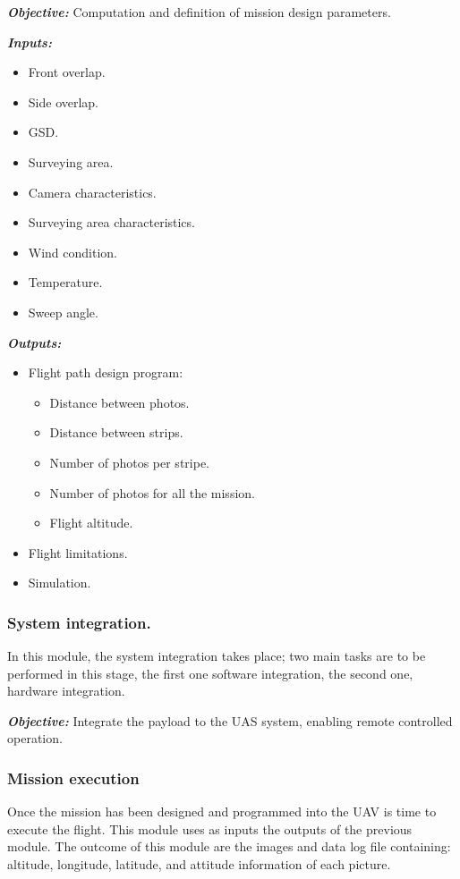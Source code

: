 \textit{\textbf{Objective:}} Computation and definition of mission design parameters.

\textit{\textbf{Inputs:}} 
\begin{itemize}
    \item Front overlap.
    \item Side overlap.
    \item GSD.
    \item Surveying area.
    \item Camera characteristics.
    \item Surveying area characteristics.
    \item Wind condition.
    \item Temperature.
    \item Sweep angle.
\end{itemize}

\textit{\textbf{Outputs:}} 
\begin{itemize}
    \item Flight path design program:\begin{itemize}
        \item Distance between photos.
        \item Distance between strips.
        \item Number of photos per stripe.
        \item Number of photos for all the mission.
        \item Flight altitude.
    \end{itemize}
    \item Flight limitations.
    \item Simulation.
\end{itemize}
\subsubsection{System integration.}
In this module, the system integration takes place; two main tasks are to be performed in this stage, the first one software integration, the second one, hardware integration.


\textit{\textbf{Objective:}} Integrate the payload to the UAS system, enabling remote controlled operation.

\subsubsection{Mission execution}
Once the mission has been designed and programmed into the UAV is time to execute the flight. This module uses as inputs the outputs of the previous module. The outcome of this module are the images and data log file containing: altitude, longitude, latitude, and attitude information of each picture.

